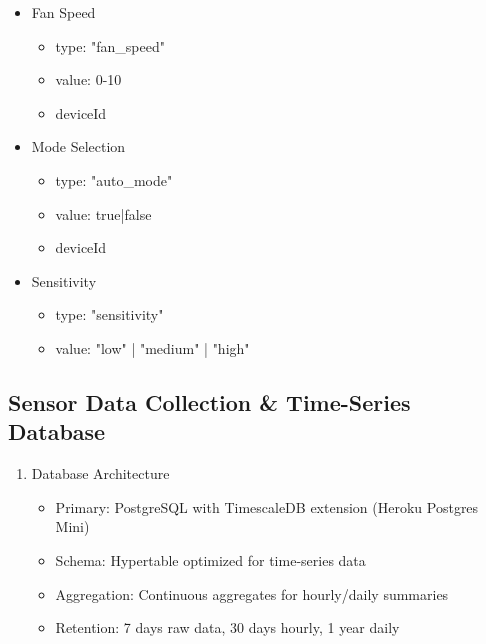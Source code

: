 \documentclass[conference]{IEEEtran}
\begin{document}
\begin{enumerate}
\begin{itemize}
                        \begin{itemize}
                            \item type: "power"
                            \item value: true|false
                            \item deviceId
                            \item timestamp
                        \end{itemize}
                    \item Fan Speed 
                        \begin{itemize}
                            \item type: "fan\_speed"
                            \item value: 0-10
                            \item deviceId
                        \end{itemize}
                    \item Mode Selection
                        \begin{itemize}
                            \item type: "auto\_mode"
                            \item value: true|false
                            \item deviceId
                        \end{itemize}
                    \item Sensitivity
                        \begin{itemize}
                            \item type: "sensitivity"
                            \item value: "low" | "medium" | "high"
                        \end{itemize}
                \end{itemize}
        \end{enumerate}       
    \subsection{\textbf{Sensor Data Collection \& Time-Series Database}}
        \begin{enumerate}
            \item Database Architecture
                \begin{itemize}
                    \item Primary: PostgreSQL with TimescaleDB extension (Heroku Postgres Mini)
                    \item Schema: Hypertable optimized for time-series data
                    \item Aggregation: Continuous aggregates for hourly/daily summaries
                    \item Retention: 7 days raw data, 30 days hourly, 1 year daily
                \end{itemize}
        \end{enumerate}   
\end{document}
